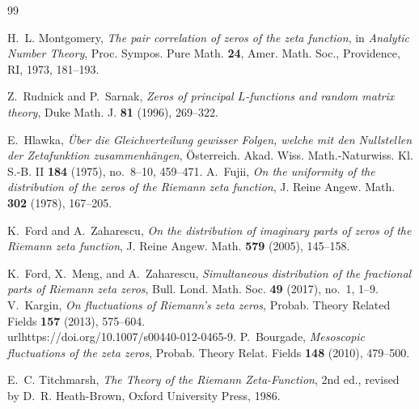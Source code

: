 \documentclass[pdflatex,sn-mathphys-num]{sn-jnl}
\numberwithin{equation}{section}
\theoremstyle{thmstyleone}
\theoremstyle{thmstylethree}
\theoremstyle{thmstyletwo}
\newcommand{\1}{\mathbf 1}
\begin{document}
\begin{thebibliography}{99}
\raggedright

H.~L. Montgomery,
\textit{The pair correlation of zeros of the zeta function},
in \textit{Analytic Number Theory}, Proc. Sympos. Pure Math. \textbf{24},
Amer. Math. Soc., Providence, RI, 1973, 181--193.

Z.~Rudnick and P.~Sarnak,
\textit{Zeros of principal $L$-functions and random matrix theory},
Duke Math. J. \textbf{81} (1996), 269--322.

E.~Hlawka,
\textit{\"Uber die Gleichverteilung gewisser Folgen, welche mit den Nullstellen der Zetafunktion zusammenh\"angen},
\"Osterreich. Akad. Wiss. Math.-Naturwiss. Kl. S.-B. II
\textbf{184} (1975), no.~8--10, 459--471.
A.~Fujii,
\textit{On the uniformity of the distribution of the zeros of the Riemann zeta function},
J. Reine Angew. Math. \textbf{302} (1978), 167--205.

K.~Ford and A.~Zaharescu,
\textit{On the distribution of imaginary parts of zeros of the Riemann zeta function},
J. Reine Angew. Math. \textbf{579} (2005), 145--158.

K.~Ford, X.~Meng, and A.~Zaharescu,
\textit{Simultaneous distribution of the fractional parts of Riemann zeta zeros},
Bull. Lond. Math. Soc. \textbf{49} (2017), no.~1, 1--9.
V.~Kargin,
\textit{On fluctuations of Riemann's zeta zeros},
Probab. Theory Related Fields \textbf{157} (2013), 575--604.
\\url{https://doi.org/10.1007/s00440-012-0465-9}.
P.~Bourgade,
\textit{Mesoscopic fluctuations of the zeta zeros},
Probab. Theory Relat. Fields \textbf{148} (2010), 479--500.

E.~C. Titchmarsh,
\textit{The Theory of the Riemann Zeta-Function},
2nd ed., revised by D.~R. Heath-Brown,
Oxford University Press, 1986.


\end{thebibliography}
\end{document}
